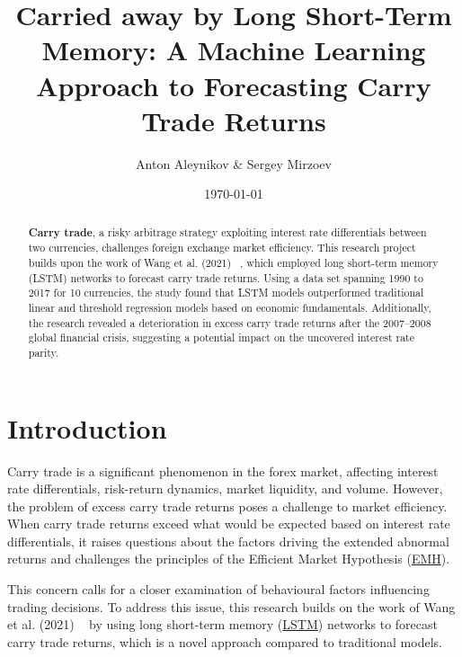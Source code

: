 \documentclass[a4paper,10pt]{article}
\begin{document}
\title{Carried away by Long Short-Term Memory: A Machine Learning Approach to Forecasting Carry Trade Returns}
\author{Anton Aleynikov \& Sergey Mirzoev}
\date{\today}
\maketitle

\begin{abstract}

\textbf{Carry trade}, a risky arbitrage strategy exploiting interest rate differentials between two currencies, challenges foreign exchange market efficiency. This research project builds upon the work of Wang et al. (2021) ~\cite{wang2021machine}, which employed long short-term memory (LSTM) networks to forecast carry trade returns. Using a data set spanning 1990 to 2017 for 10 currencies, the study found that LSTM models outperformed traditional linear and threshold regression models based on economic fundamentals. Additionally, the research revealed a deterioration in excess carry trade returns after the 2007–2008 global financial crisis, suggesting a potential impact on the uncovered interest rate parity.
\end{abstract}

\section{Introduction}


Carry trade is a significant phenomenon in the forex market, affecting interest rate differentials, risk-return dynamics, market liquidity, and volume. However, the problem of excess carry trade returns poses a challenge to market efficiency. When carry trade returns exceed what would be expected based on interest rate differentials, it raises questions about the factors driving the extended abnormal returns and challenges the principles of the Efficient Market Hypothesis (\hyperref[appx:emh]{EMH}).

This concern calls for a closer examination of behavioural factors influencing trading decisions. To address this issue, this research builds on the work of Wang et al. (2021) ~\cite{wang2021machine} by using long short-term memory (\hyperref[appx:lstm]{LSTM}) networks to forecast carry trade returns, which is a novel approach compared to traditional models.
\end{document}
